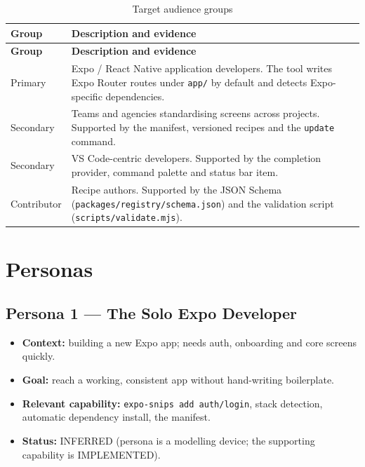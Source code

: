 \begin{longtable}{@{}L{3.6cm}L{10.8cm}@{}}
\caption{Target audience groups}\\
\toprule
\textbf{Group} & \textbf{Description and evidence} \\
\midrule
\endfirsthead
\toprule
\textbf{Group} & \textbf{Description and evidence} \\
\midrule
\endhead
Primary & Expo / React Native application developers. The tool writes Expo Router
          routes under \texttt{app/} by default and detects Expo-specific
          dependencies. \\
Secondary & Teams and agencies standardising screens across projects. Supported by
            the manifest, versioned recipes and the \texttt{update} command. \\
Secondary & VS Code-centric developers. Supported by the completion provider,
            command palette and status bar item. \\
Contributor & Recipe authors. Supported by the JSON Schema
              (\texttt{packages/registry/schema.json}) and the validation script
              (\texttt{scripts/validate.mjs}). \\
\bottomrule
\end{longtable}

\section{Personas}

\subsection*{Persona 1 --- The Solo Expo Developer}
\begin{itemize}
  \item \textbf{Context:} building a new Expo app; needs auth, onboarding and core
        screens quickly.
  \item \textbf{Goal:} reach a working, consistent app without hand-writing
        boilerplate.
  \item \textbf{Relevant capability:} \texttt{expo-snips add auth/login}, stack
        detection, automatic dependency install, the manifest.
  \item \textbf{Status:} INFERRED (persona is a modelling device; the supporting
        capability is IMPLEMENTED).
\end{itemize}

